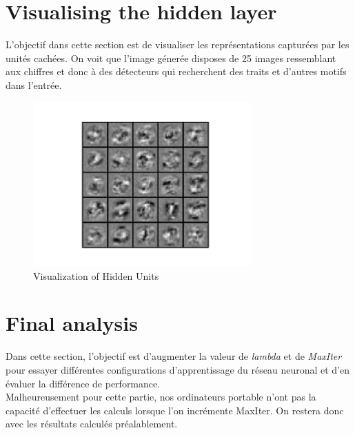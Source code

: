 \clearpage
\section{Visualising the hidden layer}

L'objectif dans cette section est de visualiser les représentations capturées par les unités cachées.
On voit que l'image génerée disposes de 25 images ressemblant aux chiffres et donc à des détecteurs qui 
recherchent des traits et d'autres motifs dans l'entrée.

\begin{figure}[!h]
    \begin{center}
        \includegraphics[width=0.75\textwidth]{./img/last.png}
        \caption{\label{fig:last}Visualization of Hidden Units}  
    \end{center}
\end{figure}

\section{Final analysis}

Dans cette section, l'objectif est d'augmenter la valeur de \textit{lambda} et de \textit{MaxIter} pour
essayer différentes configurations d'apprentissage du réseau neuronal et d'en évaluer la différence de 
performance. \\

Malheureusement pour cette partie, nos ordinateurs portable n'ont pas la capacité d'effectuer les calculs 
lorsque l'on incrémente MaxIter. On restera donc avec les résultats calculés préalablement.